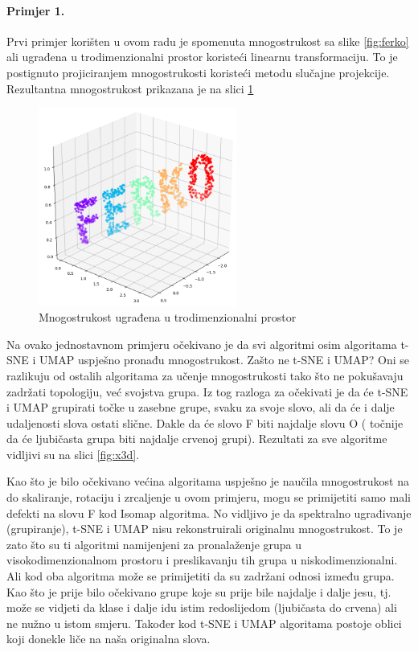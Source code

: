 \documentclass[times, utf8, diplomski]{fer}
\begin{document}
\paragraph{Primjer 1.}
Prvi primjer korišten u ovom radu je spomenuta mnogostrukost sa slike \ref{fig:ferko} ali ugrađena u trodimenzionalni prostor koristeći linearnu transformaciju. To je postignuto projiciranjem mnogostrukosti koristeći metodu slučajne projekcije. Rezultantna mnogostrukost prikazana je na slici \ref{fig:ferko3d}

\begin{figure}[htb]
    \centering
    \includegraphics[width=6.5cm]{resources/images/reduction/compare/ferko3d.png}
    \caption{Mnogostrukost ugrađena u trodimenzionalni prostor}
    \label{fig:ferko3d}
\end{figure}

Na ovako jednostavnom primjeru očekivano je da svi algoritmi osim algoritama t-SNE i UMAP uspješno pronađu mnogostrukost. Zašto ne t-SNE i UMAP? Oni se razlikuju od ostalih algoritama za učenje mnogostrukosti tako što ne pokušavaju zadržati topologiju, već svojstva grupa. Iz tog razloga za očekivati je da će t-SNE i UMAP grupirati točke u zasebne grupe, svaku za svoje slovo, ali da će i dalje udaljenosti slova ostati slične. Dakle da će slovo F biti najdalje slovu O ( točnije da će ljubičasta grupa biti najdalje crvenoj grupi). Rezultati za sve algoritme vidljivi su na slici \ref{fig:x3d}.

Kao što je bilo očekivano većina algoritama uspješno je naučila mnogostrukost na do skaliranje, rotaciju i zrcaljenje u ovom primjeru, mogu se primijetiti samo mali defekti na slovu F kod Isomap algoritma. No vidljivo je da spektralno ugrađivanje (grupiranje), t-SNE i UMAP nisu rekonstruirali originalnu mnogostrukost. To je zato što su ti algoritmi namijenjeni za pronalaženje grupa u visokodimenzionalnom prostoru i preslikavanju tih grupa u niskodimenzionalni. Ali kod oba algoritma može se primijetiti da su zadržani odnosi između grupa. Kao što je prije bilo očekivano grupe koje su prije bile najdalje i dalje jesu, tj. može se vidjeti da klase i dalje idu istim redoslijedom (ljubičasta do crvena) ali ne nužno u istom smjeru. Također kod t-SNE i UMAP algoritama postoje oblici koji donekle liče na naša originalna slova.
\end{document}
